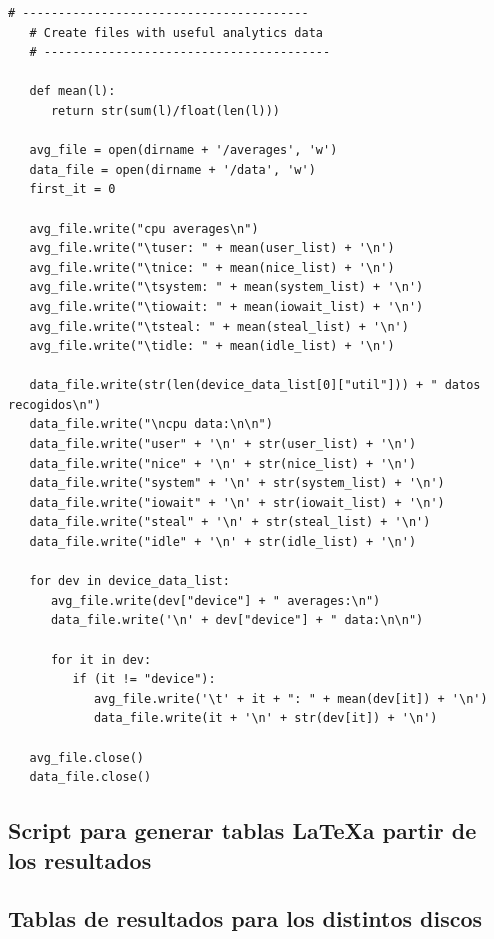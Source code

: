 \documentclass[a4paper,10pt]{article}
\begin{document}
  \begin{lstlisting}[style=pystyle]
   # ----------------------------------------
   # Create files with useful analytics data   
   # ----------------------------------------
   
   def mean(l):
      return str(sum(l)/float(len(l))) 
   
   avg_file = open(dirname + '/averages', 'w')
   data_file = open(dirname + '/data', 'w')
   first_it = 0
   
   avg_file.write("cpu averages\n")
   avg_file.write("\tuser: " + mean(user_list) + '\n')
   avg_file.write("\tnice: " + mean(nice_list) + '\n')
   avg_file.write("\tsystem: " + mean(system_list) + '\n')
   avg_file.write("\tiowait: " + mean(iowait_list) + '\n')
   avg_file.write("\tsteal: " + mean(steal_list) + '\n')
   avg_file.write("\tidle: " + mean(idle_list) + '\n')
   
   data_file.write(str(len(device_data_list[0]["util"])) + " datos recogidos\n")
   data_file.write("\ncpu data:\n\n")
   data_file.write("user" + '\n' + str(user_list) + '\n')
   data_file.write("nice" + '\n' + str(nice_list) + '\n')
   data_file.write("system" + '\n' + str(system_list) + '\n')
   data_file.write("iowait" + '\n' + str(iowait_list) + '\n')
   data_file.write("steal" + '\n' + str(steal_list) + '\n')
   data_file.write("idle" + '\n' + str(idle_list) + '\n')

   for dev in device_data_list:
      avg_file.write(dev["device"] + " averages:\n")
      data_file.write('\n' + dev["device"] + " data:\n\n")
      
      for it in dev:            
         if (it != "device"):
            avg_file.write('\t' + it + ": " + mean(dev[it]) + '\n')		 
            data_file.write(it + '\n' + str(dev[it]) + '\n')

   avg_file.close()
   data_file.close()
  \end{lstlisting}
  
  \subsection*{Script para generar tablas \LaTeX \space a partir de los resultados}
  \hypertarget{gentables}{}
  
 \newpage
 \subsection*{Tablas de resultados para los distintos discos}
 \hypertarget{tablas}{}
 
% 
  
\newpage
\printbibliography
\end{document}
